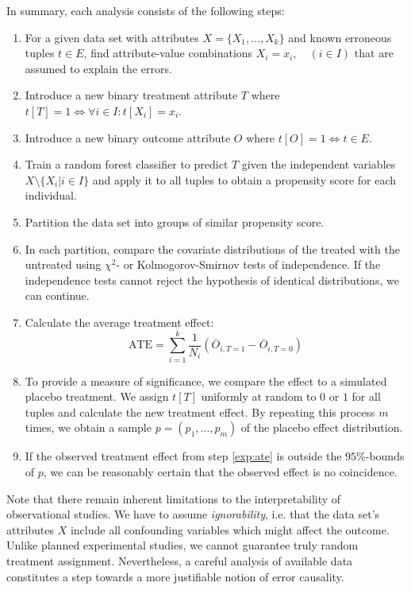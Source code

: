 \documentclass[acmsmall, nonacm, screen]{acmart} %
\begin{document}
In summary, each analysis consists of the following steps:
\begin{enumerate}
\item For a given data set with attributes $X = \{X_1, \dots, X_k\}$ and known erroneous tuples $t \in E$, find attribute-value combinations $X_i = x_i, \quad (i \in I)$ that are assumed to explain the errors.
\item Introduce a new binary treatment attribute $T$ where $t[T] = 1 \Leftrightarrow \forall i \in I: t[X_i] = x_i$.
\item Introduce a new binary outcome attribute $O$ where $t[O] = 1 \Leftrightarrow t \in E$.
\item Train a random forest classifier to predict $T$ given the independent variables $X \setminus \{X_i | i \in I\}$ and apply it to all tuples to obtain a propensity score for each individual.
\item Partition the data set into groups of similar propensity score.
\item In each partition, compare the covariate distributions of the treated with the untreated using $\chi^2$- or Kolmogorov-Smirnov tests of independence. If the independence tests cannot reject the hypothesis of identical distributions, we can continue.
\item\label{exp:ate} Calculate the average treatment effect:
\[
\text{ATE} = \sum_{i=1}^{k}{\frac{1}{N_i}(\overline{O}_{i, T = 1} - \overline{O}_{i, T = 0})}
\]
\item To provide a measure of significance, we compare the effect to a simulated placebo treatment. We assign $t[T]$ uniformly at random to $0$ or $1$ for all tuples and calculate the new treatment effect.
By repeating this process $m$ times, we obtain a sample $p = (p_1, \dots, p_m)$ of the placebo effect distribution.
\item If the observed treatment effect from step \ref{exp:ate} is outside the $95\%$-bounds of $p$, we can be reasonably certain that the observed effect is no coincidence.
\end{enumerate}

Note that there remain inherent limitations to the interpretability of observational studies. We have to assume \textit{ignorability}, i.e. that the data set's attributes $X$ include all confounding variables which might affect the outcome.
Unlike planned experimental studies, we cannot guarantee truly random treatment assignment. Nevertheless, a careful analysis of available data constitutes a step towards a more justifiable notion of error causality.\\
\end{document}
